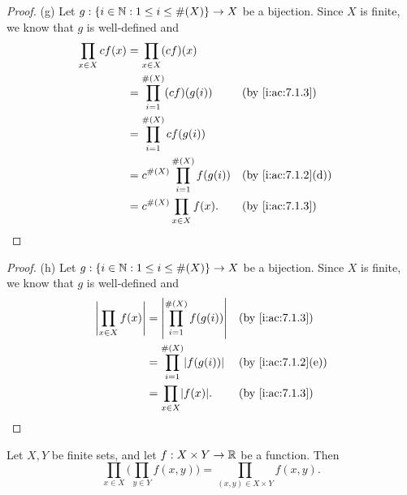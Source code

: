 \begin{proof}{(g)}
  Let \(g : \left\lbrace i \in \mathbb{N} : 1 \leq i \leq \#(X)\right\rbrace \to X\) be a bijection.
  Since \(X\) is finite, we know that \(g\) is well-defined and
  \begin{align*}
    \prod_{x \in X} cf(x) & = \prod_{x \in X} (cf)(x)                                         \\
                          & = \prod_{i = 1}^{\#(X)} (cf)(g(i))        &  & \by{i:ac:7.1.3}    \\
                          & = \prod_{i = 1}^{\#(X)} cf(g(i))                                  \\
                          & = c^{\#(X)} \prod_{i = 1}^{\#(X)} f(g(i)) &  & \by{i:ac:7.1.2}[d] \\
                          & = c^{\#(X)} \prod_{x \in X} f(x).         &  & \by{i:ac:7.1.3}
  \end{align*}
\end{proof}

\begin{proof}{(h)}
  Let \(g : \left\lbrace i \in \mathbb{N} : 1 \leq i \leq \#(X)\right\rbrace \to X\) be a bijection.
  Since \(X\) is finite, we know that \(g\) is well-defined and
  \begin{align*}
    \abs{\prod_{x \in X} f(x)} & = \abs{\prod_{i = 1}^{\#(X)} f(g(i))} &  & \by{i:ac:7.1.3}    \\
                               & = \prod_{i = 1}^{\#(X)} \abs{f(g(i))} &  & \by{i:ac:7.1.2}[e] \\
                               & = \prod_{x \in X} \abs{f(x)}.         &  & \by{i:ac:7.1.3}
  \end{align*}
\end{proof}

\begin{ac}\label{i:ac:7.1.6}
  Let \(X, Y\) be finite sets, and let \(f : X \times Y \to \mathbb{R}\) be a function.
  Then
  \[
    \prod_{x \in X} \bigg(\prod_{y \in Y} f(x, y)\bigg) = \prod_{(x, y) \in X \times Y} f(x, y).
  \]
\end{ac}

